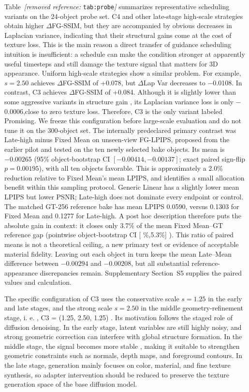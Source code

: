\documentclass[times,twocolumn,final]{elsarticle}
\providecommand{\DIFadd}[1]{{\protect\color{blue} \sf #1}} %
\providecommand{\DIFdel}[1]{{\protect\color{red} \scriptsize #1}} %
\providecommand{\DIFaddbegin}{} %
\providecommand{\DIFaddend}{} %
\providecommand{\DIFdelbegin}{} %
\providecommand{\DIFdelend}{} %
\begin{document}
\DIFdelbegin \DIFdel{Table~\textit{[removed reference: }\texttt{tab:probe}\textit{]} summarizes representative scheduling variants on the 24-object probe set. C4 and other late-stage high-scale strategies obtain higher $\Delta$FG-SSIM, but they are accompanied by obvious decreases in Laplacian variance, indicating that their structural gains come at the cost of texture loss. This is the main reason a direct transfer of guidance scheduling intuition is insufficient: a schedule can make the condition stronger at apparently useful timesteps and still damage the texture signal that matters for 3D appearance. Uniform high-scale strategies show a similar problem. For example, $s = 2.50$ achieves $\Delta$FG-SSIM of +0.078, but $\Delta$Lap Var decreases to $-$0.0108. In contrast, C3 achieves $\Delta$FG-SSIM of +0.084. Although it is slightly lower than some aggressive variants in structure gain , its Laplacian variance loss is only $-$0.0006,close to zero texture loss. Therefore, C3 is the only variant labeled Promising. We freeze this configuration before large-scale evaluation and do not tune it on the 300-object set.
}\DIFdelend \DIFaddbegin \DIFadd{The internally predeclared primary contrast was Late-high minus Fixed Mean on unseen-view FG-LPIPS, proposed from the earlier pilot and tested on the ten newly selected bake objects. Its mean is $-0.00265$ (95\% object-bootstrap CI $[-0.00414,-0.00137]$; exact paired sign-flip $p=0.00195$), with all ten objects favorable. This is approximately a 2.0\% reduction relative to Fixed Mean's mean LPIPS, and identifies a small allocation benefit within this sampling protocol. Generic Linear has a slightly lower mean LPIPS but lower PSNR; Late-high does not dominate every endpoint or control. The matched GT-256 reference bake has mean LPIPS 0.0590, versus 0.1303 for Fixed Mean and 0.1277 for Late-high. A post hoc description therefore puts the absolute gain in context: it closes only 3.7\% of the mean Fixed Mean--GT reference gap (pointwise object-bootstrap CI }[\DIFadd{2.3\%,5.3\%}]\DIFadd{). This ratio of paired means is not a theoretical ceiling, a new primary test or evidence of acceptable material fidelity. Leaving out each object in turn keeps the mean Late--Mean difference between $-0.00294$ and $-0.00208$, but all substantial reference-appearance discrepancies remain. Supplementary Section~S5 supplies the paired values and calculation.
}\DIFaddend 

\DIFdelbegin \DIFdel{The specific configuration of C3 uses the conservative scale $s = 1.25$ in the early and late stages, and the strong scale $s = 2.50$ in the middle geometry-refinement stage, i. e.
, C3 = (1.25, 2.50, 1.25) . Its motivation follows the staged role of diffusion denoising. In the early stage, latent variables are still highly noisy, and strong geometric correction can interfere with global structure formation. In the middle stage, the signal becomes more stable , making it suitable to strengthen geometric constraints such as normals, depth maps, and foreground contours. In the late stage, generation mainly focuses on color, material, and fine texture synthesis, so adapter intervention should be reduced to preserve the texture generation space of the base diffusion model. }%
\end{document}
